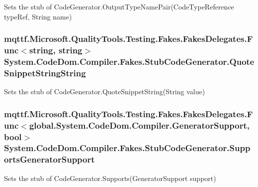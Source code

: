 Sets the stub of Code\-Generator.\-Output\-Type\-Name\-Pair(\-Code\-Type\-Reference type\-Ref, String name)

\hypertarget{class_system_1_1_code_dom_1_1_compiler_1_1_fakes_1_1_stub_code_generator_aca2ac1a9f86a09faaf78ca95bb4bb785}{
\subsubsection[{Quote\-Snippet\-String\-String}]{\setlength{\rightskip}{0pt plus 5cm}mqttf.\-Microsoft.\-Quality\-Tools.\-Testing.\-Fakes.\-Fakes\-Delegates.\-Func$<$string, string$>$ System.\-Code\-Dom.\-Compiler.\-Fakes.\-Stub\-Code\-Generator.\-Quote\-Snippet\-String\-String}}\label{class_system_1_1_code_dom_1_1_compiler_1_1_fakes_1_1_stub_code_generator_aca2ac1a9f86a09faaf78ca95bb4bb785}


Sets the stub of Code\-Generator.\-Quote\-Snippet\-String(\-String value)

\hypertarget{class_system_1_1_code_dom_1_1_compiler_1_1_fakes_1_1_stub_code_generator_a3c86c612640bd6b041dd1fea69d46b97}{
\subsubsection[{Supports\-Generator\-Support}]{\setlength{\rightskip}{0pt plus 5cm}mqttf.\-Microsoft.\-Quality\-Tools.\-Testing.\-Fakes.\-Fakes\-Delegates.\-Func$<$global.\-System.\-Code\-Dom.\-Compiler.\-Generator\-Support, bool$>$ System.\-Code\-Dom.\-Compiler.\-Fakes.\-Stub\-Code\-Generator.\-Supports\-Generator\-Support}}\label{class_system_1_1_code_dom_1_1_compiler_1_1_fakes_1_1_stub_code_generator_a3c86c612640bd6b041dd1fea69d46b97}


Sets the stub of Code\-Generator.\-Supports(\-Generator\-Support support)

